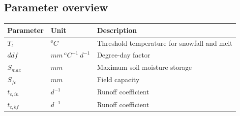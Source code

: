 \subsection{Parameter overview}
\begin{table}[htbp]
  \centering
    \begin{tabular}{lll}
    \midrule
    Parameter & Unit  & Description \\
    \midrule
    $T_t$ & $^oC$ & Threshold temperature for snowfall and melt \\
    $ddf$ & $mm~^oC^{-1}~d^{-1}$ & Degree-day factor \\
    $S_{max}$ & $mm$  & Maximum soil moisture storage \\
    $S_{fc}$ & $mm$  & Field capacity \\
    $t_{c,in}$ & $d^{-1}$ & Runoff coefficient \\
    $t_{c,bf}$ & $d^{-1}$ & Runoff coefficient \\
    \bottomrule
    \end{tabular}%
  \label{tab:addlabel}%
\end{table}%
